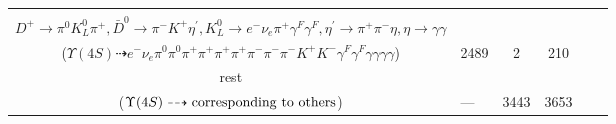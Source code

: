\documentclass[landscape]{article}
\newcounter{rownumbers}
\newcommand\rn{\stepcounter{rownumbers}\arabic{rownumbers}}
\newcommand{\EOLP}{\\ \hline} %
\newcommand{\topoTags}[1]{#1} %
\begin{document}
\begin{longtable}{clcccc}
\rn & \makecell[l]{ $ 
\Upsilon(4S) \rightarrow B^{0} \bar{B}^{0} ,
B^{0} \rightarrow \rho^{+} \eta D^{*-} ,
\bar{B}^{0} \rightarrow K^{-} D^{+} ,
\rho^{+} \rightarrow \pi^{0} \pi^{+} ,
\eta \rightarrow \gamma \gamma ,
D^{*-} \rightarrow \pi^{-} \bar{D}^{0} ,
$ \\ $
D^{+} \rightarrow \pi^{0} K_{L}^{0} \pi^{+} ,
\bar{D}^{0} \rightarrow \pi^{-} K^{+} \eta^{\prime} ,
K_{L}^{0} \rightarrow e^{-} \nu_{e} \pi^{+} \gamma^{F} \gamma^{F} ,
\eta^{\prime} \rightarrow \pi^{+} \pi^{-} \eta ,
\eta \rightarrow \gamma \gamma 
$ \\ ($
\Upsilon(4S) \dashrightarrow e^{-} \nu_{e} \pi^{0} \pi^{0} \pi^{+} \pi^{+} \pi^{+} \pi^{+} \pi^{-} \pi^{-} \pi^{-} K^{+} K^{-} \gamma^{F} \gamma^{F} \gamma \gamma \gamma \gamma 
$) } & \topoTags{2489 & }2 & 210 \EOLP

rest & \makecell[l]{ $ 
\Upsilon(4S) \rightarrow \rm{others \  (3413 \  in \  total)}
$ \\ ($
\Upsilon(4S) \dashrightarrow \rm{corresponding\ to\ others}
$) } & \topoTags{--- & }3443 & 3653 \\ \hline

\end{longtable}

\clearpage
\end{document}
